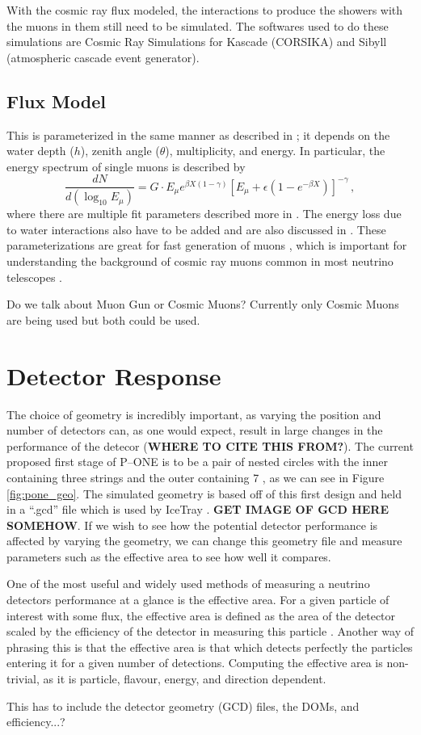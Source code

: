 With the cosmic ray flux modeled, the interactions to produce the showers with the muons in them still need to be simulated. The softwares used to do these simulations are Cosmic Ray Simulations for Kascade (CORSIKA) and Sibyll (atmospheric cascade event generator). 
\subsection{Flux Model}

 This is parameterized in the same manner as described in \cite{muon_flux}; it depends on the water depth ($h$), zenith angle ($\theta$), multiplicity, and energy. In particular, the energy spectrum of single muons is described by
\begin{equation}
  \frac{dN}{d(\log_{10}E_{\mu})} = G\cdot E_{\mu}e^{\beta X(1 - \gamma)}\left[E_{\mu} + \epsilon(1 - e^{-\beta X})\right]^{-\gamma}\, ,
\end{equation}
where there are multiple fit parameters described more in \cite{muon_flux}. The energy loss due to water interactions also have to be added and are also discussed in \cite{muon_flux}. These parameterizations are great for fast generation of muons \cite{muon_flux}, which is important for understanding the background of cosmic ray muons common in most neutrino telescopes \cite{icecube, antares, amanda, pone, muon_flux}. 

Do we talk about Muon Gun or Cosmic Muons? Currently only Cosmic Muons are being used but both could be used.

\section{Detector Response}

The choice of geometry is incredibly important, as varying the position and number of detectors can, as one would expect, result in large changes in the performance of the detecor (\textbf{WHERE TO CITE THIS FROM?}). The current proposed first stage of P--ONE is to be a pair of nested circles with the inner containing three strings and the outer containing 7 \cite{pone}, as we can see in Figure \ref{fig:pone_geo}. The simulated geometry is based off of this first design and held in a ``.gcd'' file which is used by IceTray \cite{icetray}. \textbf{GET IMAGE OF GCD HERE SOMEHOW}. If we wish to see how the potential detector performance is affected by varying the geometry, we can change this geometry file and measure parameters such as the effective area to see how well it compares.

One of the most useful and widely used methods of measuring a neutrino detectors performance at a glance is the effective area. For a given particle of interest with some flux, the effective area is defined as the area of the detector scaled by the efficiency of the detector in measuring this particle \cite{2010icecube}. Another way of phrasing this is that the effective area is that which detects perfectly the particles entering it for a given number of detections. Computing the effective area is non-trivial, as it is particle, flavour, energy, and direction dependent. 

This has to include the detector geometry (GCD) files, the DOMs, and efficiency...?

